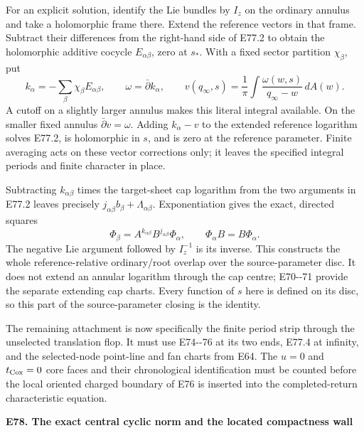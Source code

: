 For an explicit solution, identify the Lie bundles by
\(I_z\) on the ordinary annulus and take a holomorphic
frame there. Extend the reference vectors in that frame.
Subtract their differences from the right-hand side of
E77.2 to obtain the holomorphic additive cocycle
\(E_{\alpha\beta}\), zero at \(s_*\). With a fixed sector
partition \(\chi_\beta\), put
\[
 k_\alpha=-\sum_\beta\chi_\beta E_{\alpha\beta},
 \qquad \omega=\bar\partial k_\alpha,\qquad
 v(q_\infty,s)=\frac1\pi\int
                  \frac{\omega(w,s)}{q_\infty-w}\,dA(w).
 \tag{E77.3}
\]
A cutoff on a slightly larger annulus makes this literal
integral available. On the smaller fixed annulus
\(\bar\partial v=\omega\).
Adding \(k_\alpha-v\) to the extended reference logarithm
solves E77.2, is holomorphic in \(s\), and is zero at the
reference parameter. Finite averaging acts on these vector
corrections only; it leaves the specified integral periods
and finite character in place.

Subtracting \(k_{\alpha\beta}\) times the target-sheet cap
logarithm from the two arguments in E77.2 leaves precisely
\(j_{\alpha\beta}b_\beta+\Lambda_{\alpha\beta}\).
Exponentiation gives the exact, directed squares
\[
 \Phi_\beta=A^{k_{\alpha\beta}}
                      B^{j_{\alpha\beta}}\Phi_\alpha,\qquad
 \Phi_\alpha B=B\Phi_\alpha .                    \tag{E77.4}
\]
The negative Lie argument followed by \(I_z^{-1}\) is its
inverse. This constructs the whole reference-relative
ordinary/root overlap over the source-parameter disc.
It does not extend an annular logarithm through the cap
centre; E70-\/-71 provide the separate extending cap charts.
Every function of \(s\) here is defined on its disc, so this
part of the source-parameter closing is the identity.

The remaining attachment is now specifically the finite
period strip through the unselected translation flop. It
must use E74-\/-76 at its two ends, E77.4 at infinity, and
the selected-node point-line and fan charts from E64.
The \(u=0\) and \(t_{\rm Cox}=0\) core faces and their
chronological identification must be counted before the
local oriented charged boundary of E76 is inserted into
the completed-return characteristic equation.

\par

\medskip\noindent\textbf{E78. The exact central cyclic norm and the located compactness wall}

\par\nobreak

